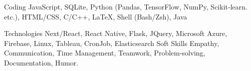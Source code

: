 

\begin{cvskills}

  \cvskill
    {Coding} %
    {JavaScript, SQLite, Python (Pandas, TensorFlow, NumPy, Scikit‑learn. etc.), HTML/CSS, C/C++, \LaTeX, Shell (Bash/Zsh), Java} %

  \cvskill
    {Technologies} %
    {Next/React, React Native, Flask, JQuery, Microsoft Azure, Firebase, Linux, Tableau, CronJob, Elasticsearch} %
  \cvskill
    {Soft Skills} %
    {Empathy, Communication, Time Management, Teamwork, Problem-solving, Documentation, Humor.} %
    

\end{cvskills}
